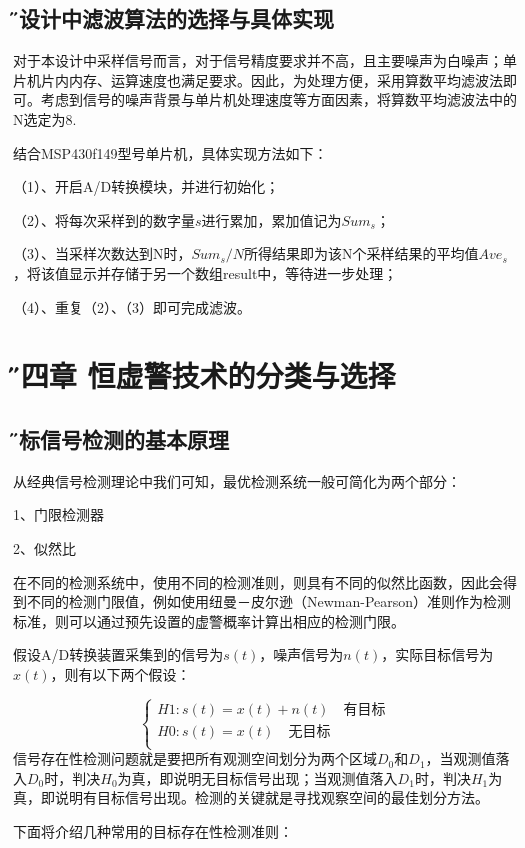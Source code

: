 \documentclass[12pt]{article} %
\newcommand{\xiaosanhao}{\fontsize{15pt}{\baselineskip}\selectfont}    %
\begin{document}
 	\subsection{\H 本设计中滤波算法的选择与具体实现}
 	对于本设计中采样信号而言，对于信号精度要求并不高，且主要噪声为白噪声；单片机片内内存、运算速度也满足要求。因此，为处理方便，采用算数平均滤波法即可。考虑到信号的噪声背景与单片机处理速度等方面因素，将算数平均滤波法中的N选定为8.
 	\par 结合MSP430f149型号单片机，具体实现方法如下：
 	\par （1）、开启A/D转换模块，并进行初始化；
 	\par （2）、将每次采样到的数字量$s$进行累加，累加值记为$Sum_s$；
 	\par （3）、当采样次数达到N时，$Sum_s/N$所得结果即为该N个采样结果的平均值$Ave_s$，将该值显示并存储于另一个数组result中，等待进一步处理；
 	\par （4）、重复（2）、（3）即可完成滤波。
 
 
 
 
 
 
 \section{\xiaosanhao \H 第四章 \quad 恒虚警技术的分类与选择}
 	\subsection{\H 目标信号检测的基本原理}
 	从经典信号检测理论中我们可知，最优检测系统一般可简化为两个部分：
 	\par 1、门限检测器
 	\par 2、似然比
 	\par 在不同的检测系统中，使用不同的检测准则，则具有不同的似然比函数，因此会得到不同的检测门限值，例如使用纽曼－皮尔逊（Newman-Pearson）准则作为检测标准，则可以通过预先设置的虚警概率计算出相应的检测门限。
 	\par 假设A/D转换装置采集到的信号为$s(t)$，噪声信号为$n(t)$，实际目标信号为$x(t)$，则有以下两个假设：
 	
 	
 	\begin{equation}
	\left\{
\begin{array}{rcl}

H1:s(t)=x(t)+n(t)\quad 有目标\\
H0:s(t)=x(t) \quad 无目标\\

\end{array} \right. 
	\end{equation}
	信号存在性检测问题就是要把所有观测空间划分为两个区域$D_0$和$D_1$，当观测值落入$D_0$时，判决$H_0$为真，即说明无目标信号出现；当观测值落入$D_1$时，判决$H_1$为真，即说明有目标信号出现。检测的关键就是寻找观察空间的最佳划分方法。
	\par 下面将介绍几种常用的目标存在性检测准则：
	
\end{document}
